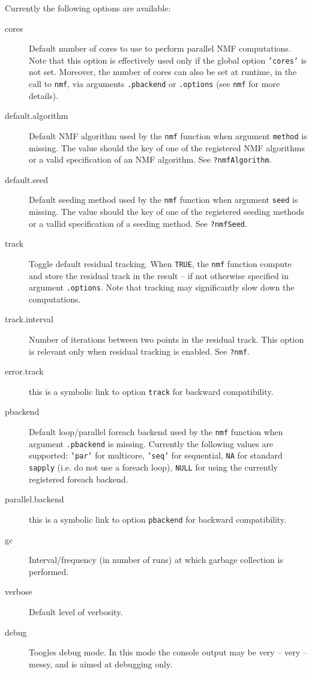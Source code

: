 \documentclass[a4paper]{article}\usepackage{graphicx, color}
\let\code=\texttt
\begin{document}
Currently the following options are available:

\begin{description}


\item[cores] Default number of cores to use to perform
parallel NMF computations. Note that this option is
effectively used only if the global option \code{'cores'}
is not set. Moreover, the number of cores can also be set
at runtime, in the call to \code{nmf}, via
arguments \code{.pbackend} or \code{.options} (see
\code{nmf} for more details).

\item[default.algorithm] Default NMF algorithm used by
the \code{nmf} function when argument \code{method} is
missing. The value should the key of one of the
registered NMF algorithms or a valid specification of an
NMF algorithm. See \code{?nmfAlgorithm}.

\item[default.seed] Default seeding method used by the
\code{nmf} function when argument \code{seed} is missing.
The value should the key of one of the registered seeding
methods or a vallid specification of a seeding method.
See \code{?nmfSeed}.

\item[track] Toggle default residual tracking. When
\code{TRUE}, the \code{nmf} function compute and store
the residual track in the result -- if not otherwise
specified in argument \code{.options}. Note that tracking
may significantly slow down the computations.

\item[track.interval] Number of iterations between two
points in the residual track. This option is relevant
only when residual tracking is enabled. See \code{?nmf}.

\item[error.track] this is a symbolic link to option
\code{track} for backward compatibility.

\item[pbackend] Default loop/parallel foreach backend
used by the \code{nmf} function when argument
\code{.pbackend} is missing. Currently the following
values are supported: \code{'par'} for multicore,
\code{'seq'} for sequential, \code{NA} for standard
\code{sapply} (i.e. do not use a foreach loop),
\code{NULL} for using the currently registered foreach
backend.

\item[parallel.backend] this is a symbolic link to option
\code{pbackend} for backward compatibility.

\item[gc] Interval/frequency (in number of runs) at which
garbage collection is performed.

\item[verbose] Default level of verbosity.

\item[debug] Toogles debug mode. In this mode the console
output may be very -- very -- messy, and is aimed at
debugging only.


\end{description}
 
\end{document}
